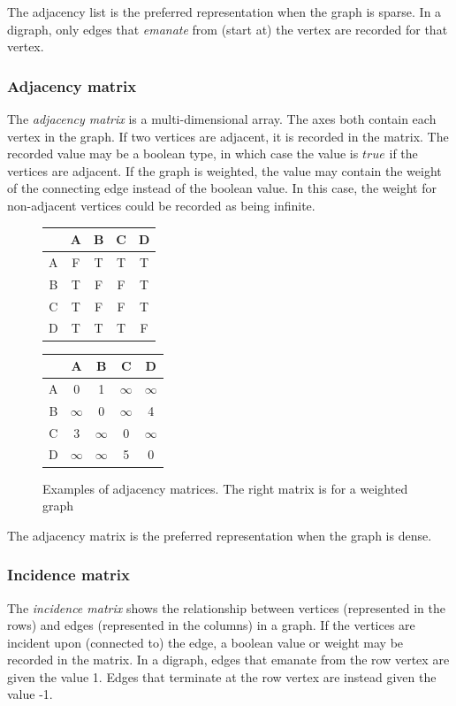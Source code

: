 \documentclass{article}
\begin{document}
{The adjacency list is the preferred representation when the graph is sparse. In a digraph, only edges that {\em emanate} from
(start at) the vertex are recorded for that vertex.

\subsubsection{Adjacency matrix}
The {\em adjacency matrix} is a multi-dimensional array. The axes both contain each vertex in the graph. If two vertices are
adjacent, it is recorded in the matrix. The recorded value may be a boolean type, in which case the value is \(true\) if the
vertices are adjacent. If the graph is weighted, the value may contain the weight of the connecting edge instead of the boolean
value. In this case, the weight for non-adjacent vertices could be recorded as being infinite.

\begin{figure}[H]
  \centering
  \begin{tabular}{|c|c|c|c|c|}
    \hline
    \  & A & B & C & D \\ [0.5ex] 
    \hline
    A  & F & T & T & T \\ 
    \hline
    B  & T & F & F & T \\
    \hline
    C  & T & F & F & T \\
    \hline
    D  & T & T & T & F \\
    \hline
  \end{tabular}
  \quad
  \begin{tabular}{|c|c|c|c|c|}
    \hline
    \  & A          & B          & C          & D \\ [0.5ex] 
    \hline
    A  & 0          & 1          & \(\infty\) & \(\infty\) \\ 
    \hline
    B  & \(\infty\) & 0          & \(\infty\) & 4 \\
    \hline
    C  & 3          & \(\infty\) & 0          & \(\infty\) \\
    \hline
    D  & \(\infty\) & \(\infty\) & 5          & 0 \\
    \hline
  \end{tabular}
  \caption{Examples of adjacency matrices. The right matrix is for a weighted graph}
\end{figure}

The adjacency matrix is the preferred representation when the graph is dense.

\subsubsection{Incidence matrix}
The {\em incidence matrix} shows the relationship between vertices (represented in the rows) and edges (represented in the
columns) in a graph. If the vertices are incident upon (connected to) the edge, a boolean value or weight may be recorded
in the matrix. In a digraph, edges that emanate from the row vertex are given the value 1. Edges that terminate at the row vertex
are instead given the value -1.

}
\end{document}
